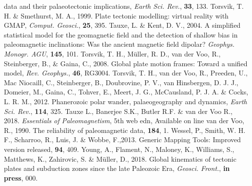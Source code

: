 \begin{thebibliography}{}
  data and their palaeotectonic implications, \textit{Earth Sci. Rev.},
  \textbf{33}, 133.
  Torsvik, T. H. \& Smethurst, M. A., 1999. Plate tectonic modelling: virtual
  reality with GMAP, \textit{Comput. Geosci.}, \textbf{25}, 395.
  Tauxe, L. \& Kent, D. V., 2004. A simplified statistical model for the
  geomagnetic field and the detection of shallow bias in paleomagnetic
  inclinations: Was the ancient magnetic field dipolar? \textit{Geophys.
  Monogr. AGU}, \textbf{145}, 101.
  Torsvik, T. H., M{\"{u}}ller, R. D., van der Voo, R., Steinberger, B., \&
  Gaina, C., 2008. Global plate motion frames: Toward a unified model,
  \textit{Rev. Geophys.}, \textbf{46}, RG3004.
  Torsvik, T. H., van der Voo, R., Preeden, U., Mac Niocaill, C., Steinberger,
  B., Doubrovine, P. V., van Hinsbergen, D. J. J., Domeier, M., Gaina, C.,
  Tohver, E., Meert, J. G., McCausland, P. J. A. \& Cocks, L. R. M., 2012.
  Phanerozoic polar wander, palaeogeography and dynamics, \textit{Earth Sci.
  Rev.}, \textbf{114}, 325.
  Tauxe L., Banerjee S.K., Butler R.F. \& van der Voo R., 2018.
  \textit{Essentials of Paleomagnetism}, 5th web edn, Available on line
  van der Voo, R., 1990. The reliability of paleomagnetic data,
  \tecto{}\textbf{184}, 1.
  Wessel, P., Smith, W. H. F., Scharroo, R., Luis, J. \& Wobbe, F.,2013. Generic
  Mapping Tools: Improved version released, \eos{}\textbf{94}, 409.
  Young, A., Flament, N., Maloney, K., Williams, S., Matthews, K., Zahirovic, S.
  \& Müller, D., 2018. Global kinematics of tectonic plates and subduction zones
  since the late Paleozoic Era, \textit{Geosci. Front.},
  \textbf{in press}, 000.
\end{thebibliography}~\label{lastpage}
